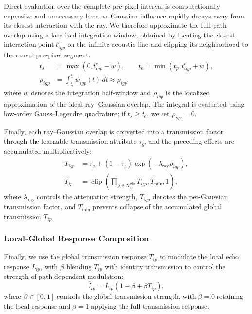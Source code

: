 Direct evaluation over the complete pre-pixel interval is computationally
expensive and unnecessary because Gaussian influence rapidly decays away from
its closest interaction with the ray. We therefore approximate the full-path
overlap using a localized integration window, obtained by locating the closest
interaction point $t^{c}_{igp}$ on the infinite acoustic line and clipping its
neighborhood to the causal pre-pixel segment:
\begin{equation}
\begin{aligned}
t_s &= \max(0,t^{c}_{igp}-w),
\qquad
t_e = \min(t_p,t^{c}_{igp}+w),
\\
\rho_{igp}
&=
\int_{t_s}^{t_e}
\psi_{igp}(t)\,dt
\approx
\bar{\rho}_{igp}.
\end{aligned}
\label{eq:localized-ray-overlap}
\end{equation}
where $w$ denotes the integration half-window and $\rho_{igp}$ is the
localized approximation of the ideal ray--Gaussian overlap. The integral is
evaluated using low-order Gauss--Legendre quadrature; if $t_s\geq t_e$, we set
$\rho_{igp}=0$.

Finally, each ray--Gaussian overlap is converted into a transmission factor
through the learnable transmission attribute $\tau_g$, and the preceding
effects are accumulated multiplicatively:
\begin{equation}
\begin{aligned}
T_{igp}
&=
\tau_g
+
\left(
1-\tau_g
\right)
\exp
\left(
-\lambda_{\mathrm{ray}}\rho_{igp}
\right),
\\
T_{ip}
&=
\operatorname{clip}
\left(
\prod_{g\in\mathcal N^{\mathrm{glo}}_{ip}}
T_{igp},
T_{\min},
1
\right),
\end{aligned}
\label{eq:global-transmission}
\end{equation}
where $\lambda_{\mathrm{ray}}$ controls the attenuation strength,
$T_{igp}$ denotes the per-Gaussian transmission factor, and $T_{\min}$ prevents
collapse of the accumulated global transmission $T_{ip}$.

\subsubsection{Local-Global Response Composition}

Finally, we use the global transmission response $T_{ip}$ to modulate the local
echo response $L_{ip}$, with $\beta$ blending $T_{ip}$ with identity
transmission to control the strength of path-dependent modulation:
\begin{equation}
\widehat I_{ip}
=
L_{ip}
\left(
1-\beta+\beta T_{ip}
\right),
\label{eq:local-global-composition}
\end{equation}
where $\beta\in[0,1]$ controls the global transmission strength, with
$\beta=0$ retaining the local response and $\beta=1$ applying the full
transmission response.


